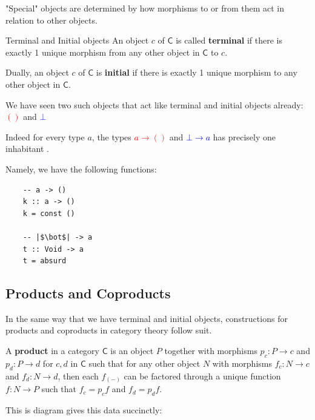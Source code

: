 \documentclass[tikz]{beamer}
\newcommand{\cat}[1]{\bm{ \mathsf{#1} }}
\newcommand{\cc}{\cat{C}}
\newcommand{\mred}[1]{\textcolor{red}{$#1$}}
\newcommand{\mblue}[1]{\textcolor{blue}{$#1$}}
\theoremstyle{definition}
\begin{document}
\frame
{
	"Special" objects are determined by how morphisms to or from them act in relation to other objects. 
}

\frame
{
	\begin{definition}{Terminal and Initial objects}
		An object $c$ of $\cc$ is called \textbf{terminal} if there is exactly 1 unique morphism from any other object in $\cc$ to $c$. 
		
		Dually,  an object $c$ of $\cc$ is \textbf{initial} if there is exactly 1 unique morphism to any other object in $\cc$. 
	\end{definition}
}

\frame
{
	We have seen two such objects that act like terminal and initial objects already: \mred{()} and \mblue{\bot}
}

\frame
{
	Indeed for every type $a$, the types \mred{a \to ()} and \mblue{\bot \to a} has precisely one inhabitant . 
}

\begin{frame}[fragile]

Namely, we have the following functions: 

	\begin{verbatim}
	-- a -> ()
	k :: a -> ()
	k = const ()
	
	-- |$\bot$| -> a
	t :: Void -> a
	t = absurd
	\end{verbatim}
\end{frame}

\subsection{Products and Coproducts}

\frame
{

	In the same way that we have terminal and initial objects, constructions for products and coproducts in category theory follow suit.
}

\frame
{
	\begin{definition}[Product]
	
		A \textbf{product} in a category $\cc$ is an object $P$ together with morphisms $p_c : P \to c$ and $p_d : P \to d$ for $c,d$ in $\cc$ such that for any other object $N$ with morphisms $f_c : N \to c$ and $f_d : N \to d$, then each $f_{(-)}$ can be factored through a unique function $f : N \to P$ such that $f_c = p_cf$ and $f_d = p_df$. 
	\end{definition}
}

\begin{frame}[fragile]
	This is diagram gives this data succinctly: 
	
	\begin{center}
	\end{center}
\end{frame}
\end{document}
